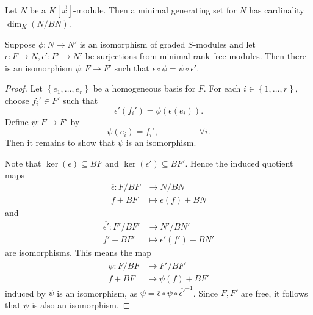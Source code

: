 \documentclass[co439]{subfiles}
\begin{document}
    \begin{cor}{}
        Let $N$ be a $K\left[ \vec{x} \right]$-module. Then a minimal generating set for $N$ has cardinality $\dim_K\left( N /BN \right)$.
    \end{cor}	

    \rruleline

    \begin{lemma}{}
        Suppose $\phi:N\to N'$ is an isomorphism of graded $S$-modules and let $\epsilon:F\to N, \epsilon':F'\to N'$ be surjections from minimal rank free modules. Then there is an isomorphism $\psi:F\to F'$ such that $\epsilon\circ\phi = \psi\circ\epsilon'$.
    \end{lemma}

    \begin{proof}
        Let $\left\lbrace e_1,\ldots,e_r \right\rbrace$ be a homogeneous basis for $F$. For each $i\in\left\lbrace 1,\ldots,r \right\rbrace$, choose $f_i'\in F'$ such that
        \begin{equation*}
            \epsilon'\left( f_i' \right) = \phi\left( \epsilon\left( e_i \right) \right).
        \end{equation*}
        Define $\psi:F\to F'$ by
        \begin{equation*}
            \psi\left( e_i \right)=f_i', \hspace{2cm}\forall i.
        \end{equation*}
        Then it remains to show that $\psi$ is an isomorphism.

        Note that $\ker\left( \epsilon \right)\subseteq BF$ and $\ker\left( \epsilon' \right)\subseteq BF'$. Hence the induced quotient maps
        \begin{equation*}
            \begin{aligned}
                \overline{\epsilon}:F /BF&\to N /BN \\
                f + BF & \mapsto \epsilon\left( f \right) + BN
            \end{aligned} 
        \end{equation*}
        and
        \begin{equation*}
            \begin{aligned}
                \overline{\epsilon'}:F' /BF'&\to N' /BN' \\
                f' + BF' & \mapsto \epsilon'\left( f' \right) + BN'
            \end{aligned} 
        \end{equation*}
        are isomorphisms. This means the map
        \begin{equation*}
            \begin{aligned}
                \overline{\psi}:F /BF & \to F' /BF' \\
                f + BF & \mapsto \psi\left( f \right) + BF'
            \end{aligned} 
        \end{equation*}
        induced by $\psi$ is an isomorphism, as $\overline{\psi} = \overline{\epsilon}\circ\overline{\psi}\circ\overline{\epsilon'}^{-1}$. Since $F,F'$ are free, it follows that $\psi$ is also an isomorphism.
    \end{proof}
    
\end{document}
